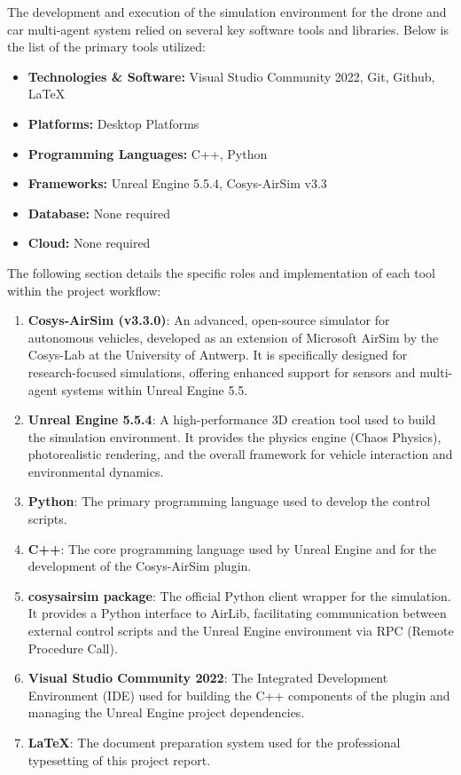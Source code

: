 The development and execution of the simulation environment for the drone and car multi-agent system relied on several key software tools and libraries. Below is the list of the primary tools utilized:

\begin{itemize}
    \item \textbf{Technologies \& Software:} Visual Studio Community 2022, Git, Github, LaTeX
    \item \textbf{Platforms:} Desktop Platforms
    \item \textbf{Programming Languages:} C++, Python
    \item \textbf{Frameworks:} Unreal Engine 5.5.4, Cosys-AirSim v3.3
    \item \textbf{Database:} None required
    \item \textbf{Cloud:} None required
\end{itemize}
\noindent
The following section details the specific roles and implementation of each tool within the project workflow:

\begin{enumerate}
    \item \textbf{Cosys-AirSim (v3.3.0)}: An advanced, open-source simulator for autonomous vehicles, developed as an extension of Microsoft AirSim by the Cosys-Lab at the University of Antwerp. It is specifically designed for research-focused simulations, offering enhanced support for sensors and multi-agent systems within Unreal Engine 5.5.
    \item \textbf{Unreal Engine 5.5.4}: A high-performance 3D creation tool used to build the simulation environment. It provides the physics engine (Chaos Physics), photorealistic rendering, and the overall framework for vehicle interaction and environmental dynamics.
    \item \textbf{Python}: The primary programming language used to develop the control scripts.
    \item \textbf{C++}: The core programming language used by Unreal Engine and for the development of the Cosys-AirSim plugin.
    \item \textbf{cosysairsim package}: The official Python client wrapper for the simulation. It provides a Python interface to AirLib, facilitating communication between external control scripts and the Unreal Engine environment via RPC (Remote Procedure Call).
    \item \textbf{Visual Studio Community 2022}: The Integrated Development Environment (IDE) used for building the C++ components of the plugin and managing the Unreal Engine project dependencies.
    \item \textbf{\LaTeX}: The document preparation system used for the professional typesetting of this project report.
\end{enumerate}